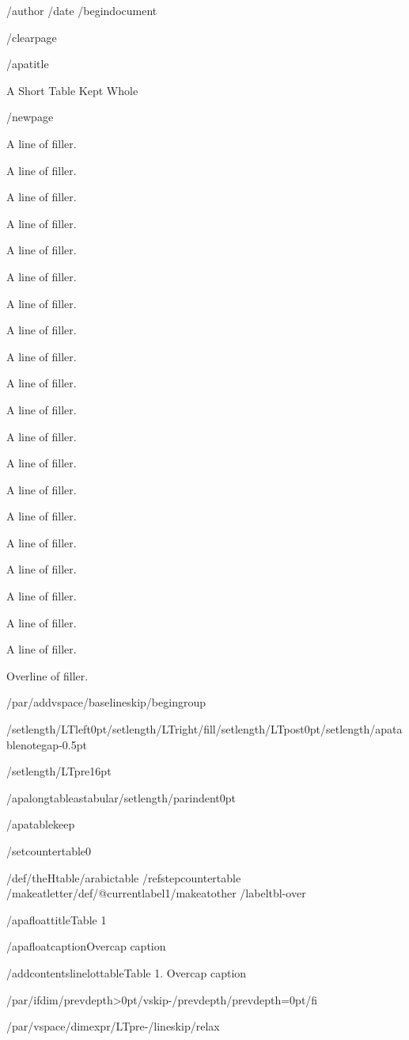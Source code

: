 /author{}
/date{}
/begin{document}


/clearpage

/apatitle{

A Short Table Kept Whole

}

/newpage{}

A line of filler.

A line of filler.

A line of filler.

A line of filler.

A line of filler.

A line of filler.

A line of filler.

A line of filler.

A line of filler.

A line of filler.

A line of filler.

A line of filler.

A line of filler.

A line of filler.

A line of filler.

A line of filler.

A line of filler.

A line of filler.

A line of filler.

A line of filler.

Overline of filler.

/par/addvspace{/baselineskip}/begingroup

/setlength{/LTleft}{0pt}/setlength{/LTright}{/fill}/setlength{/LTpost}{0pt}/setlength{/apatablenotegap}{-0.5pt}

/setlength{/LTpre}{16pt}

/apalongtableastabular/setlength{/parindent}{0pt}

/apatablekeep

/setcounter{table}{0}

/def/theHtable{/arabic{table}}%
/refstepcounter{table}%
/makeatletter/def/@currentlabel{1}/makeatother%
/label{tbl-over}

/apafloattitle{Table 1}

/apafloatcaption{Overcap caption}

/addcontentsline{lot}{table}{Table 1. Overcap caption}

/par/ifdim/prevdepth>0pt/vskip-/prevdepth/prevdepth=0pt/fi

/par/vspace{/dimexpr/LTpre-/lineskip/relax}

